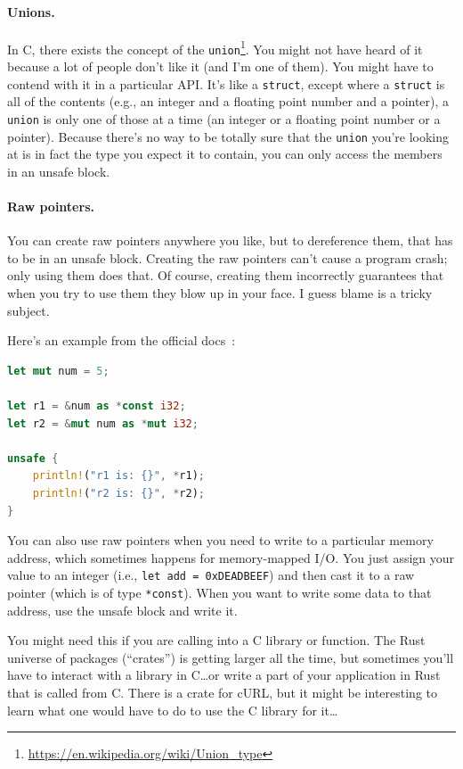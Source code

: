 \documentclass[a4paper]{report}
\begin{document}
\paragraph{Unions.}
In C, there exists the concept of the \texttt{union}\footnote{\url{https://en.wikipedia.org/wiki/Union_type}}. You might not have heard of it because a lot of people don't like it (and I'm one of them). You might have to contend with it in a particular API.  It's like a \texttt{struct}, except where a \texttt{struct} is all of the contents (e.g., an integer and a floating point number and a pointer), a \texttt{union} is only one of those at a time (an integer or a floating point number or a pointer). Because there's no way to be totally sure that the \texttt{union} you're looking at is in fact the type you expect it to contain, you can only access the members in an unsafe block. 


\paragraph{Raw pointers.}
You can create raw pointers anywhere you like, but to dereference them, that has to be in an unsafe block. Creating the raw pointers can't cause a program crash; only using them does that. Of course, creating them incorrectly guarantees that when you try to use them they blow up in your face. I guess blame is a tricky subject.

Here's an example from the official docs~\cite{rustdocs}:
\begin{lstlisting}[language=Rust]
let mut num = 5;

let r1 = &num as *const i32;
let r2 = &mut num as *mut i32;

unsafe {
    println!("r1 is: {}", *r1);
    println!("r2 is: {}", *r2);
}
\end{lstlisting}

You can also use raw pointers when you need to write to a particular memory address, which sometimes happens for memory-mapped I/O. You just assign your value to an integer (i.e., \texttt{let add = 0xDEADBEEF}) and then cast it to a raw pointer (which is of type \texttt{*const}). When you want to write some data to that address, use the unsafe block and write it.

You might need this if you are calling into a C library or function. The Rust universe of packages (``crates'') is getting larger all the time, but sometimes you'll have to interact with a library in C\ldots or write a part of your application in Rust that is called from C. There is a crate for cURL, but it might be interesting to learn what one would have to do to use the C library for it\ldots
\end{document}
